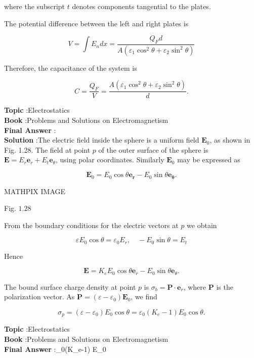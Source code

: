 \documentclass[10pt]{article}
\begin{document}
where the subscript $t$ denotes components tangential to the plates.

 The potential difference between the left and right plates is

$$
V=\int E_{n} d x=\frac{Q_{F} d}{A\left(\varepsilon_{1} \cos ^{2} \theta+\varepsilon_{2} \sin ^{2} \theta\right)}
$$

Therefore, the capacitance of the system is

$$
C=\frac{Q_{F}}{V}=\frac{A\left(\varepsilon_{1} \cos ^{2} \theta+\varepsilon_{2} \sin ^{2} \theta\right)}{d} .
$$



\textbf{Topic} :Electrostatics\\
\textbf{Book} :Problems and Solutions on Electromagnetism\\
\textbf{Final Answer} :\\


\textbf{Solution} :The electric field inside the sphere is a uniform field $\mathbf{E}_{0}$, as shown in Fig. 1.28. The field at point $p$ of the outer surface of the sphere is $\mathbf{E}=E_{r} \mathbf{e}_{r}+E_{t} \mathbf{e}_{\theta}$, using polar coordinates. Similarly $\mathbf{E}_{0}$ may be expressed as

$$
\mathbf{E}_{0}=E_{0} \cos \theta \mathbf{e}_{\boldsymbol{r}}-E_{0} \sin \theta \mathbf{e}_{\boldsymbol{\theta}} .
$$

MATHPIX IMAGE

Fig. $1.28$

From the boundary conditions for the electric vectors at $p$ we obtain

$$
\varepsilon E_{0} \cos \theta=\varepsilon_{0} E_{r}, \quad-E_{0} \sin \theta=E_{t}
$$

Hence

$$
\mathbf{E}=K_{e} E_{0} \cos \theta \mathbf{e}_{r}-E_{0} \sin \theta \mathbf{e}_{\theta} .
$$

The bound surface charge density at point $p$ is $\sigma_{b}=\mathbf{P} \cdot \mathbf{e}_{r}$, where $\mathbf{P}$ is the polarization vector. As $\mathbf{P}=\left(\varepsilon-\varepsilon_{0}\right) \mathbf{E}_{0}$, we find

$$
\sigma_{p}=\left(\varepsilon-\varepsilon_{0}\right) E_{0} \cos \theta=\varepsilon_{0}\left(K_{e}-1\right) E_{0} \cos \theta .
$$



\textbf{Topic} :Electrostatics\\
\textbf{Book} :Problems and Solutions on Electromagnetism\\
\textbf{Final Answer} :\varepsilon_{0}\left(K_{e}-1\right) E_{0} \cos \theta\\
\end{document}
